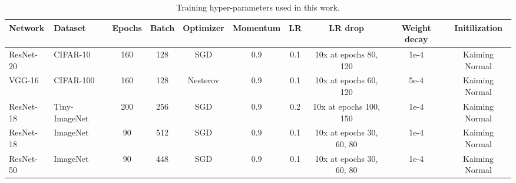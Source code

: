 \begin{table*}[h!]
    \begin{center}
    \caption{
    Training hyper-parameters used in this work.  }
        \label{tab:training-hyperparams}
    \resizebox{1\linewidth}{!}
    {
    \begin{tabular}{ ll cccccccc}
    \\
    \hline
    \toprule
    Network & Dataset & Epochs & Batch & Optimizer & Momentum & LR & LR drop & Weight decay & Initilization \\
    \midrule
    ResNet-20 & CIFAR-10 & 160 & 128 & SGD & 0.9 & 0.1 & 10x at epochs 80, 120 & 1e-4 & Kaiming Normal \\
    VGG-16 & CIFAR-100 & 160 & 128 & Nesterov & 0.9 & 0.1 & 10x at epochs 60, 120 & 5e-4 & Kaiming Normal \\
    ResNet-18 & Tiny-ImageNet & 200 & 256 & SGD & 0.9 & 0.2 & 10x at epochs 100, 150 & 1e-4 & Kaiming Normal \\
    ResNet-18 & ImageNet & 90 & 512 & SGD & 0.9 & 0.1 & 10x at epochs 30, 60, 80 & 1e-4 & Kaiming Normal \\
    ResNet-50 & ImageNet & 90 & 448 & SGD & 0.9 & 0.1 & 10x at epochs 30, 60, 80 & 1e-4 & Kaiming Normal \\

    \bottomrule
    \end{tabular}
    
    }
    
    \end{center}
    

\end{table*}